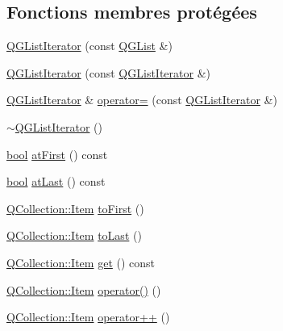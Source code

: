 \subsection*{Fonctions membres protégées}
\begin{DoxyCompactItemize}
\item 
\hyperlink{class_q_g_list_iterator_a587dd0b283af87ffb8df810f5206cd02}{Q\+G\+List\+Iterator} (const \hyperlink{class_q_g_list}{Q\+G\+List} \&)
\item 
\hyperlink{class_q_g_list_iterator_a3526a8a9e1b4c106acaaf75a14c65ec8}{Q\+G\+List\+Iterator} (const \hyperlink{class_q_g_list_iterator}{Q\+G\+List\+Iterator} \&)
\item 
\hyperlink{class_q_g_list_iterator}{Q\+G\+List\+Iterator} \& \hyperlink{class_q_g_list_iterator_a5320ce8818d1c7f1f9d17adb34ff91ea}{operator=} (const \hyperlink{class_q_g_list_iterator}{Q\+G\+List\+Iterator} \&)
\item 
\hyperlink{class_q_g_list_iterator_ae636616a077384cd6a9cd7b1531fecbd}{$\sim$\+Q\+G\+List\+Iterator} ()
\item 
\hyperlink{qglobal_8h_a1062901a7428fdd9c7f180f5e01ea056}{bool} \hyperlink{class_q_g_list_iterator_a77e3fd8dffd4f8f75af69a09421cd053}{at\+First} () const 
\item 
\hyperlink{qglobal_8h_a1062901a7428fdd9c7f180f5e01ea056}{bool} \hyperlink{class_q_g_list_iterator_af0d781ef242eff01e50f8e02508fbb4e}{at\+Last} () const 
\item 
\hyperlink{class_q_collection_ac6f3ddbf999e31fb797927f71ae6b5d7}{Q\+Collection\+::\+Item} \hyperlink{class_q_g_list_iterator_a65a49050bd33ce28a4f56f774b2a8133}{to\+First} ()
\item 
\hyperlink{class_q_collection_ac6f3ddbf999e31fb797927f71ae6b5d7}{Q\+Collection\+::\+Item} \hyperlink{class_q_g_list_iterator_a022efda7534a08ad813ac40b2c65c189}{to\+Last} ()
\item 
\hyperlink{class_q_collection_ac6f3ddbf999e31fb797927f71ae6b5d7}{Q\+Collection\+::\+Item} \hyperlink{class_q_g_list_iterator_ae58a7565650a3785747eb838e225de40}{get} () const 
\item 
\hyperlink{class_q_collection_ac6f3ddbf999e31fb797927f71ae6b5d7}{Q\+Collection\+::\+Item} \hyperlink{class_q_g_list_iterator_a02fdcc2e446abf393e499c9049bd3770}{operator()} ()
\item 
\hyperlink{class_q_collection_ac6f3ddbf999e31fb797927f71ae6b5d7}{Q\+Collection\+::\+Item} \hyperlink{class_q_g_list_iterator_a5b09cd40d71a15e6737ab03e7f5594c7}{operator++} ()
\item 

\end{DoxyCompactItemize}
